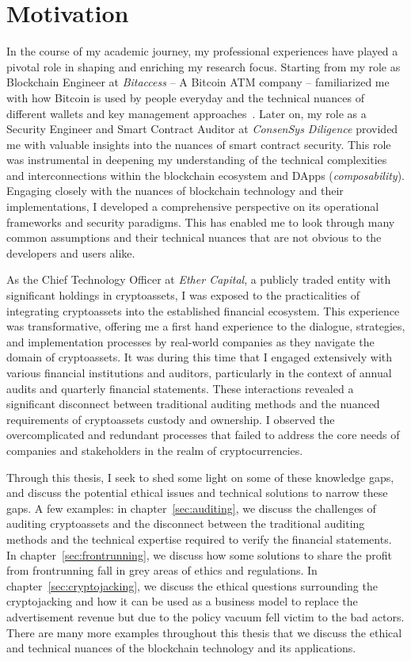 \section{Motivation} \label{sec:intro:motivation}
In the course of my academic journey, my professional experiences have played a pivotal role in shaping and enriching my research focus. Starting from my role as Blockchain Engineer at \textit{Bitaccess} -- A Bitcoin ATM company -- familiarized me with how Bitcoin is used by people everyday and the technical nuances of different wallets and key management approaches~\cite{eskandari2015real,eskandari2016buy,EBSC15}. Later on, my role as a Security Engineer and Smart Contract Auditor at \textit{ConsenSys Diligence} provided me with valuable insights into the nuances of smart contract security. This role was instrumental in deepening my understanding of the technical complexities and interconnections within the blockchain ecosystem and DApps (\textit{composability}). Engaging closely with the nuances of blockchain technology and their implementations, I developed a comprehensive perspective on its operational frameworks and security paradigms. This has enabled me to look through many common assumptions and their technical nuances that are not obvious to the developers and users alike.

As the Chief Technology Officer at \textit{Ether Capital}, a publicly traded entity with significant holdings in cryptoassets, I was exposed to the practicalities of integrating cryptoassets into the established financial ecosystem. This experience was transformative, offering me a first hand experience to the dialogue, strategies, and implementation processes by real-world companies as they navigate the domain of cryptoassets. It was during this time that I engaged extensively with various financial institutions and auditors, particularly in the context of annual audits and quarterly financial statements. These interactions revealed a significant disconnect between traditional auditing methods and the nuanced requirements of cryptoassets custody and ownership. I observed the overcomplicated and redundant processes that failed to address the core needs of companies and stakeholders in the realm of cryptocurrencies.

Through this thesis, I seek to shed some light on some of these knowledge gaps, and discuss the potential ethical issues and technical solutions to narrow these gaps. A few examples: in chapter~\ref{sec:auditing}, we discuss the challenges of auditing cryptoassets and the disconnect between the traditional auditing methods and the technical expertise required to verify the financial statements. In chapter~\ref{sec:frontrunning}, we discuss how some solutions to share the profit from frontrunning fall in grey areas of ethics and regulations. In chapter~\ref{sec:cryptojacking}, we discuss the ethical questions surrounding the cryptojacking and how it can be used as a business model to replace the advertisement revenue but due to the policy vacuum fell victim to the bad actors. There are many more examples throughout this thesis that we discuss the ethical and technical nuances of the blockchain technology and its applications.



